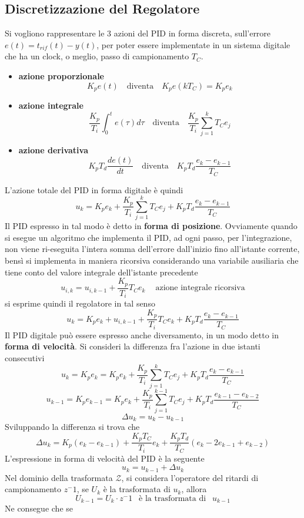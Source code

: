 \documentclass[10pt, letterpaper]{report}
\begin{document}
\subsection{Discretizzazione del Regolatore}
Si vogliono rappresentare le 3 azioni del PID in forma discreta, sull'errore $e(t)=t_{rif}(t)-y(t)$, per poter essere implementate in un sistema digitale che ha un clock, o meglio, passo di campionamento $T_C$.\begin{itemize}
\item\textbf{azione proporzionale}
$$K_p e(t) \ \ \ \text{ diventa }\ \ \  K_pe(kT_C)=K_pe_k$$
\item\textbf{azione integrale}
$$\frac{K_p}{T_i}\int_0^te(\tau)d\tau \ \ \ \text{ diventa }\ \ \ \frac{K_p}{T_i}\sum_{j=1}^k T_Ce_j $$
\item\textbf{azione derivativa}
$$K_pT_d \frac{de(t)}{dt} \ \ \ \text{ diventa }\ \ \ K_pT_d \frac{e_k-e_{k-1}}{T_C}$$
\end{itemize}
L'azione totale del PID in forma digitale è quindi 
$$
u_k=K_pe_k+\frac{K_p}{T_i}\sum_{j=1}^k T_Ce_j + K_pT_d \frac{e_k-e_{k-1}}{T_C}
$$
Il PID espresso in tal modo è detto in \textbf{forma di posizione}. Ovviamente quando si esegue un algoritmo che implementa il PID, ad ogni passo, per l'integrazione, non viene ri-eseguita l'intera somma dell'errore dall'inizio fino all'istante corrente, bensì si implementa in maniera ricorsiva considerando una variabile ausiliaria che tiene conto del valore integrale dell'istante precedente  
$$u_{i,k}=u_{i,k-1}+\frac{K_p}{T_i}T_Ce_k  \ \ \ \ \text{ azione integrale ricorsiva}$$
si esprime quindi il regolatore in tal senso 
$$
u_k=K_pe_k+u_{i,k-1}+\frac{K_p}{T_i}T_Ce_k + K_pT_d \frac{e_k-e_{k-1}}{T_C}
$$
Il PID digitale può essere espresso anche diversamento, in un modo detto in \textbf{forma di velocità}. Si consideri la differenza fra l'azione in due istanti consecutivi
$$
u_k=K_pe_k=K_pe_k+\frac{K_p}{T_i}\sum_{j=1}^k T_Ce_j + K_pT_d \frac{e_k-e_{k-1}}{T_C}
$$
$$
u_{k-1}=K_pe_{k-1}=K_pe_k+\frac{K_p}{T_i}\sum_{j=1}^{k-1} T_Ce_j + K_pT_d \frac{e_{k-1}-e_{k-2}}{T_C}
$$ $$ \Delta u_k = u_k-u_{k-1}$$
Sviluppando la differenza si trova che 
$$ 
\Delta u_k = K_p(e_k-e_{k-1})+\frac{K_pT_C}{T_i}e_k+\frac{K_pT_d}{T_C}(e_k-2e_{k-1}+e_{k-2})
$$
L'espressione in forma di velocità del PID è la seguente 
$$ u_k=u_{k-1}+\Delta u_k$$
Nel dominio della trasformata $\mathcal Z$, si considera l'operatore del ritardi di campionamento $z^-1$, se $U_k$ è la trasformata di $u_k$, allora 
$$ U_{k-1}=U_k\cdot z^-1\ \  \text{ è la trasformata di }\ \  u_{k-1}$$
Ne consegue che se 
\end{document}
